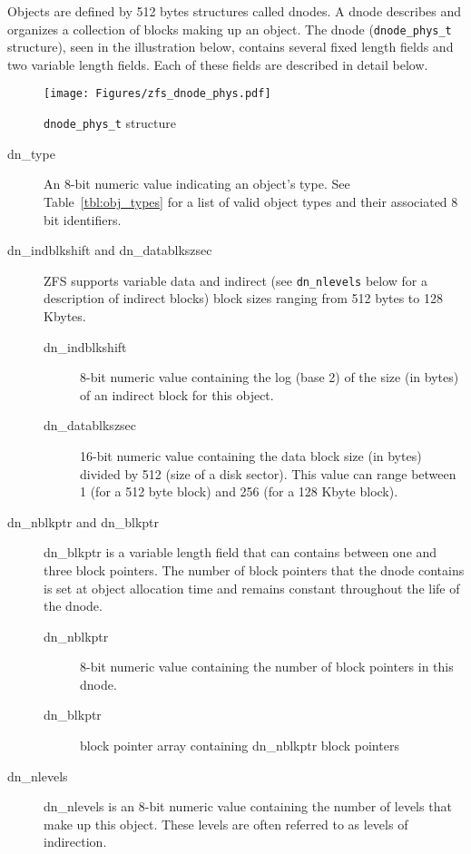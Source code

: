 Objects are defined by 512 bytes structures called dnodes.
A dnode describes and organizes a collection of blocks making up an object.
The dnode (\lstinline{dnode_phys_t} structure),
seen in the illustration below,
contains several fixed length fields and two variable length fields.
Each of these fields are described in detail below.

\begin{figure}[ht]
 \centering
 \hspace*{2cm}\texttt{[image: Figures/zfs\_dnode\_phys.pdf]}
 \caption{\lstinline{dnode_phys_t} structure}
 \label{fig:zfs_dnode_phys}
\end{figure}

\begin{description}
  \item[dn\_type]
    An 8-bit numeric value indicating an object's type.
    See Table~\ref{tbl:obj_types}
    for a list of valid object types and their associated 8 bit identifiers.
  \item[dn\_indblkshift {\normalfont and} dn\_datablkszsec]
    ZFS supports variable data and indirect
    (see \lstinline{dn_nlevels} below for a description of indirect blocks)
    block sizes ranging from 512 bytes to 128 Kbytes.
    \begin{description}
      \item[dn\_indblkshift]
        8-bit numeric value containing the log (base 2) of the size (in bytes)
        of an indirect block for this object.
      \item[dn\_datablkszsec]
        16-bit numeric value containing the data block size (in bytes)
        divided by 512 (size of a disk sector).
        This value can range between 1 (for a 512 byte block) and 256
        (for a 128 Kbyte block).
    \end{description}
  \item[dn\_nblkptr {\normalfont and} dn\_blkptr]
    dn\_blkptr is a variable length field that can contains between one and three block pointers.
    The number of block pointers that
    the dnode contains is set at object allocation time
    and remains constant throughout the life of the dnode.
    \begin{description}
      \item[dn\_nblkptr]
        8-bit numeric value containing the number of block pointers in this dnode.
      \item[dn\_blkptr]
        block pointer array containing dn\_nblkptr block pointers
    \end{description}
  \item[dn\_nlevels]
    dn\_nlevels is an 8-bit numeric value containing
    the number of levels
    that make up this object.
    These levels are often referred to as levels of indirection.


\end{description}
